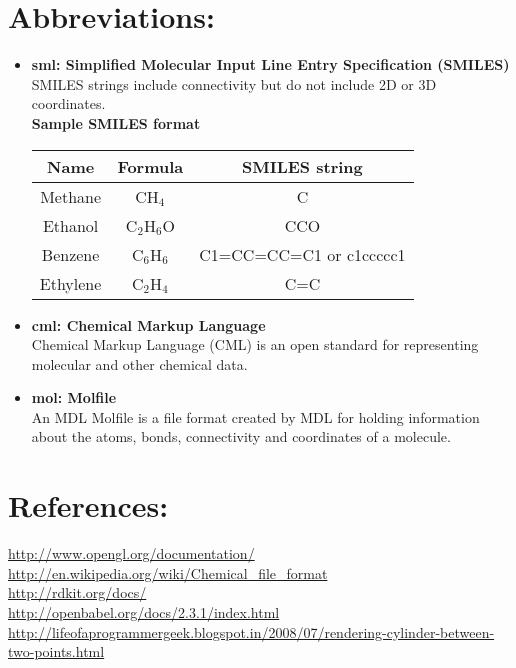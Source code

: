 \documentclass{report}
\begin{document}
\section*{Abbreviations:}
\begin{itemize}
	\item	\textbf{sml: Simplified Molecular Input Line Entry Specification (SMILES)}\\
	SMILES strings include connectivity but do not include 2D or 3D coordinates.\\
\textbf{ Sample SMILES format}\\
\begin{tabular}{|c|c|c|}
\hline 
\textbf{Name} & \textbf{Formula} & \textbf{SMILES string} \\ 
\hline 
Methane & CH$_4$ & C \\ 
\hline 
Ethanol & C$_2$H$_6$O & CCO\\ 
\hline 
Benzene & C$_6$H$_6$ & C1=CC=CC=C1 or c1ccccc1\\ 
\hline 
Ethylene & C$_2$H$_4$& C=C\\ 
\hline 
\end{tabular} 
	\item	\textbf{cml: Chemical Markup Language}\\Chemical Markup Language (CML) is an open standard for representing molecular and other chemical data.
	\item	\textbf{mol: Molfile}\\
	An MDL Molfile is a file format created by MDL for holding information about the atoms, bonds, connectivity and coordinates of a molecule.
\end{itemize}

\section*{References:}
\url{http://www.opengl.org/documentation/}\\
\url{http://en.wikipedia.org/wiki/Chemical_file_format}\\
\url{http://rdkit.org/docs/}\\
\url{http://openbabel.org/docs/2.3.1/index.html}\\
\url{http://lifeofaprogrammergeek.blogspot.in/2008/07/rendering-cylinder-between-two-points.html}\\
\end{document}
